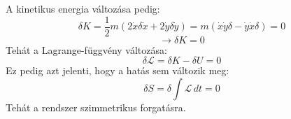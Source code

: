 \documentclass[../main.tex]{subfiles}
\begin{document}
A kinetikus energia változása pedig:
\begin{equation}
    \delta K = \frac{1}{2}m(2\dot{x} \delta \dot{x} + 2\dot{y} \delta \dot{y}) = m(\dot{x} \dot{y} \delta - \dot{y} \dot{x} \delta) = 0
\end{equation}
\begin{equation}
    \rightarrow \delta K = 0
\end{equation}
Tehát a Lagrange-függvény változása:
\begin{equation}
    \delta \mathcal{L} = \delta K - \delta U = 0
\end{equation}
Ez pedig azt jelenti, hogy a hatás sem változik meg:
\begin{equation}
    \delta S = \delta \int \mathcal{L} \, dt = 0
\end{equation}
Tehát a rendszer szimmetrikus forgatásra.
\end{document}
